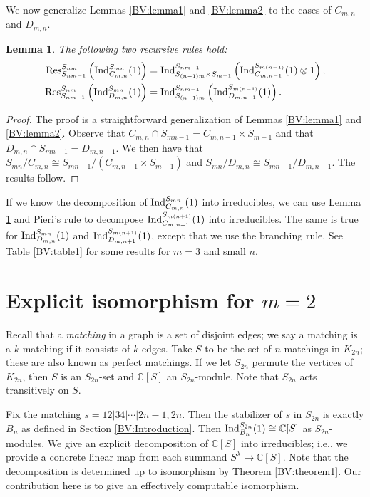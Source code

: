 \documentclass[12pt]{amsart}
\newtheorem{lemma}[theorem]{Lemma}
\numberwithin{theorem}{section}
\newcommand{\CC}{\mathbb{C}}
\newcommand{\Ind}{\textup{Ind}}
\newcommand{\Res}{\textup{Res}}
\begin{document}
We now generalize Lemmas \ref{BV:lemma1} and \ref{BV:lemma2} to the cases of $C_{m,n}$ and $D_{m,n}$.

\begin{lemma}\label{BV:lemma3}
The following two recursive rules hold:
\begin{align*}
\Res_{S_{nm-1}}^{S_{nm}}\left(\Ind_{C_{m,n}}^{S_{mn}}(1)\right) &= \Ind_{S_{(n-1)m} \times S_{m-1}}^{S_{nm-1}}\left(\Ind_{C_{m,n-1}}^{S_{m(n-1)}}(1) \otimes 1\right), \\
\Res_{S_{nm-1}}^{S_{nm}}\left(\Ind_{D_{m,n}}^{S_{mn}}(1)\right) &= \Ind_{S_{(n-1)m} }^{S_{nm-1}}\left(\Ind_{D_{m,n-1}}^{S_{m(n-1)}}(1)\right).
\end{align*}
\end{lemma}
\begin{proof}
The proof is a straightforward generalization of Lemmas \ref{BV:lemma1} and \ref{BV:lemma2}.
Observe that $C_{m,n} \cap S_{mn-1} = C_{m,n-1} \times S_{m-1}$ and that $D_{m,n} \cap S_{mn-1} = D_{m,n-1}$.
We then have that $S_{mn} / C_{m,n} \cong S_{mn-1} / (C_{m,n-1} \times S_{m-1})$ and 
$S_{mn} / D_{m,n} \cong S_{mn-1} / D_{m,n-1}$.
The results follow.
\end{proof}
If we know the decomposition of $\Ind_{C_{m,n}}^{S_{mn}}(1)$ into irreducibles, we can use Lemma \ref{BV:lemma3} and Pieri's rule to decompose $\Ind_{C_{m,n+1}}^{S_{m(n+1)}}(1)$ into irreducibles.
The same is true for $\Ind_{D_{m,n}}^{S_{mn}}(1)$ and $\Ind_{D_{m,n+1}}^{S_{m(n+1)}}(1)$, except that we use the branching rule.
See Table \ref{BV:table1} for some results for $m=3$ and small $n$.

\section{Explicit isomorphism for $m=2$}\label{BV:section3}
Recall that a {\em matching} in a graph is a set of disjoint edges; we say a matching is a $k$-matching if it consists of $k$ edges.
Take $S$ to be the set of $n$-matchings in $K_{2n}$; these are also known as perfect matchings.
If we let $S_{2n}$ permute the vertices of $K_{2n}$, then $S$ is an $S_{2n}$-set and $\CC[S]$ an $S_{2n}$-module.
Note that $S_{2n}$ acts transitively on $S$.


Fix the matching $s = 12|34|\cdots|2n-1,2n$.
Then the stabilizer of $s$ in $S_{2n}$ is exactly $B_n$ as defined in Section 
\ref{BV:Introduction}.
Then $\Ind_{B_n}^{S_{2n}}(1) \cong \CC[S]$ as $S_{2n}$-modules.
We give an explicit decomposition of $\CC[S]$ into irreducibles; i.e., we provide a concrete linear map from each summand $S^\lambda \to \CC[S]$.
Note that the decomposition is determined up to isomorphism by Theorem \ref{BV:theorem1}.
Our contribution here is to give an effectively computable isomorphism.
\end{document}
